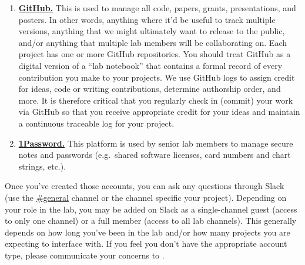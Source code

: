 \documentclass{tufte-book} %
\begin{document}
\begin{enumerate}
\item \href{https://www.github.com}{\textbf{GitHub.}}
    This is used
  to manage all code, papers, grants, presentations, and posters.  In
  other words, anything where it'd be useful to track multiple
  versions, anything that we might ultimately want to release to the
  public, and/or anything that multiple lab members will be
  collaborating on.  Each project has one or more GitHub repositories.  You should treat GitHub as a digital version of a ``lab notebook''
  that contains a formal record of every contribution you make to your projects.  We use GitHub logs to assign credit for ideas, code or writing contributions,
  determine authorship order, and more.  It is therefore critical that you regularly check in (commit) your work via GitHub so that you receive appropriate credit for your
  ideas and maintain a continuous traceable log for your project.
\item \href{https://1password.com/}{\textbf{1Password.}}
   This platform is used by senior
  lab members to manage secure notes and passwords (e.g.\ shared
  software licenses, card numbers and chart strings, etc.).

\end{enumerate}

Once you've created those accounts, you can ask any questions through
Slack (use the
\href{https://context-lab.slack.com/messages/general/}{\#general}
channel or the channel specific your project).  Depending on your role
in the lab, you may be added on Slack as a single-channel guest
(access to only one channel) or a full member (access to all lab
channels).  This generally depends on how long you've been in the lab
and/or how many projects you are expecting to interface with.  If you
feel you don't have the appropriate account type, please communicate
your concerns to \director.
\end{document}
